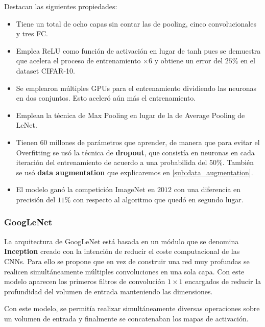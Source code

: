             \noindent Destacan las siguientes propiedades:

            \begin{itemize}
                \item Tiene un total de ocho capas sin contar las de pooling, cinco convolucionales y tres FC.
                \item Emplea ReLU como función de activación en lugar de tanh pues se demuestra que acelera el proceso de entrenamiento $\times 6$ y obtiene un error del $25\%$ en el dataset CIFAR-10.
                \item Se emplearon múltiples GPUs para el entrenamiento dividiendo las neuronas en dos conjuntos. Esto aceleró aún más el entrenamiento.
                \item Emplean la técnica de Max Pooling en lugar de la de Average Pooling de LeNet. 
                \item Tienen 60 millones de parámetros que aprender, de manera que para evitar el Overfitting se usó la técnica de \textbf{dropout}, que consistía en  neuronas en cada iteración del entrenamiento de acuerdo a una probabilida del $50\%$. También se usó \textbf{data augmentation} que explicaremos en \autoref{sub:data_augmentation}.
                \item El modelo ganó la competición ImageNet en $2012$ con una diferencia en precisión del $11\%$ con respecto al algoritmo que quedó en segundo lugar.
            \end{itemize}
        
        \subsubsection{GoogLeNet}
            \noindent La arquitectura de GoogLeNet está basada en un módulo que se denomina \textbf{Inception} creado con la intención de reducir el coste computacional de las CNNs. Para ello se propone que en vez de construir una red muy profundas se realicen simultáneamente múltiples convoluciones en una sola capa. Con este modelo aparecen los primeros filtros de convolución $1\times 1$ encargados de reducir la profundidad del volumen de entrada manteniendo las dimensiones.

            \medskip

            \noindent Con este modelo, se permitía realizar simultáneamente diversas operaciones sobre un volumen de entrada y finalmente se concatenaban los mapas de activación.

